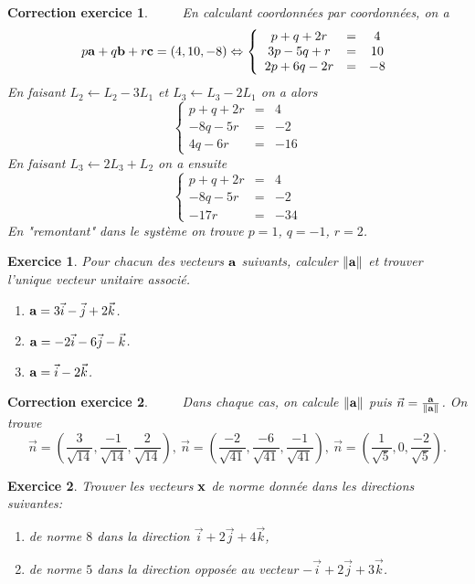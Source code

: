 \documentclass[12pt]{article}
\newtheorem{exercice}{\bf Exercice}
\newtheorem{correction}{\bf Correction exercice}
\newenvironment{exo}{
\begin{exercice}\smallskip\normalfont}{\end{exercice}
}
\newenvironment{cor}{
\begin{correction}\smallskip\normalfont}{\end{correction}
}
\newcommand{\I}{{ \vec{i}}}
\newcommand{\J}{{ \vec{j}}}
\newcommand{\K}{{ \vec{k}}}
\newif\ifcorrige\corrigetrue
\begin{document}
\ifcorrige
\color{magenta}
\begin{cor}
  $\qquad$ 
  En calculant coordonn\'ees par coordonn\'ees, on a
  $$p {\bf a}+q {\bf b}+r{\bf c}=(4,10,-8) \Leftrightarrow 
  \left \{ \begin{array}{ccc}
  p+q+2r&=&4\\
  3p-5q+r&=&10\\
  2p+6q-2r&=&-8   
  \end{array}    \right.$$
  En faisant $L_2 \leftarrow L_2-3L_1$ et $L_3\leftarrow L_3-2L_1$ on a alors 
  $$\left \{ \begin{array}{ccc}
  p+q+2r&=&4\\
  -8q-5r&=&-2\\
  4q-6r&=&-16   
  \end{array}    \right.$$
  En faisant $L_3\leftarrow 2L_3+L_2$ on a ensuite
  $$\left \{ \begin{array}{ccc}
  p+q+2r&=&4\\
  -8q-5r&=&-2\\
  -17r&=&-34   
  \end{array}    \right.$$
  En "remontant" dans le syst\`eme on trouve $p=1$, $q=-1$, $r=2$.

\end{cor}
\color{black}
\fi
\begin{exo} Pour chacun des vecteurs ${\bf a}$ suivants, calculer $\Vert {\bf a }\Vert$ et trouver l'unique vecteur unitaire associ\'e.
\begin{multicols}{3}
\begin{enumerate}
\item ${\bf a}=3\I-\J+2\K$.
\item ${\bf a}=-2\I-6\J-\K$.
\item ${\bf a}=\I-2\K$.
\end{enumerate}
\end{multicols}
\end{exo}

\ifcorrige
\color{magenta}
\begin{cor}
  $\qquad$ 
  Dans chaque cas, on calcule $\Vert {\bf a} \Vert$ puis $\vec{n}=\frac{{\bf a}}{\Vert {\bf a} \Vert}$. On trouve
  $$\vec{n}=\left(\frac{3}{\sqrt{14}}, \frac{-1}{\sqrt{14}},\frac{2}{\sqrt{14}}\right),\ \vec{n}=\left(\frac{-2}{\sqrt{41}}, \frac{-6}{\sqrt{41}},\frac{-1}{\sqrt{41}}\right),\ \vec{n}=\left(\frac{1}{\sqrt{5}}, 0,\frac{-2}{\sqrt{5}}\right).$$
\end{cor}
\color{black}
\fi

\begin{exo} Trouver les vecteurs $\bf x$ de norme donn\'ee dans les directions suivantes:
\begin{enumerate}
\item de norme $8$ dans la direction $\I+2\J+4\K$,
\item de norme $5$ dans la direction oppos\'ee au vecteur $-\I+2\J+3\K$.
\end{enumerate}
\end{exo}
\end{document}
